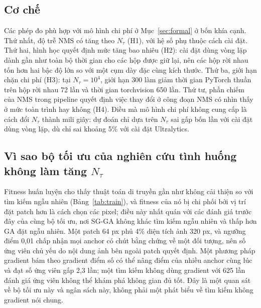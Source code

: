 \documentclass[a4paper,fleqn]{cas-dc}
\newcommand{\Ntau}{N_{\tau}}
\begin{document}
\subsection{Cơ chế}
Các phép đo phù hợp với mô hình chi phí ở Mục~\ref{sec:formal} ở bốn khía cạnh. Thứ nhất, độ trễ NMS có tăng theo $\Ntau$ (H1), với hệ số phụ thuộc cách cài đặt. Thứ hai, hình học quyết định mức tăng bao nhiêu (H2): cài đặt dùng vòng lặp dành gần như toàn bộ thời gian cho các hộp được giữ lại, nên các hộp rời nhau tốn hơn hai bậc độ lớn so với một cụm dày đặc cùng kích thước. Thứ ba, giới hạn chặn chi phí (H3): tại $\Ntau=10^4$, giới hạn 300 làm giảm thời gian PyTorch thuần trên hộp rời nhau 72 lần và thời gian torchvision 650 lần. Thứ tư, phần chiếm của NMS trong pipeline quyết định việc thay đổi ở công đoạn NMS có nhìn thấy ở mức toàn trình hay không (H4). Điều mà mô hình chi phí không cung cấp là cách đổi $\Ntau$ thành mili giây: dự đoán chỉ dựa trên $\Ntau$ sai gấp bốn lần với cài đặt dùng vòng lặp, dù chỉ sai khoảng 5\% với cài đặt Ultralytics.

\subsection{Vì sao bộ tối ưu của nghiên cứu tình huống không làm tăng $\Ntau$}
Fitness huấn luyện cho thấy thuật toán di truyền gần như không cải thiện so với tìm kiếm ngẫu nhiên (Bảng~\ref{tab:train}), và fitness của nó bị chi phối bởi vị trí đặt patch hơn là cách chọn các pixel; điều này nhất quán với các đánh giá trước đây của cùng bộ tối ưu, nơi SG-GA không khác tìm kiếm ngẫu nhiên và thấp hơn GA đặt ngẫu nhiên. Một patch 64 px phủ 4\% diện tích ảnh 320 px, và ngưỡng điểm 0,01 chấp nhận mọi anchor có chút bằng chứng về một đối tượng, nên số ứng viên chủ yếu do nội dung ảnh bên ngoài patch quyết định. Một phương pháp gradient bám theo gradient điểm số có thể nâng điểm của nhiều anchor cùng lúc và đạt số ứng viên gấp 2,3 lần; một tìm kiếm không dùng gradient với 625 lần đánh giá ứng viên không thể khám phá không gian đủ tốt. Đây là một quan sát về bộ tối ưu này và ngân sách này, không phải một phát biểu về tìm kiếm không gradient nói chung.
\end{document}
